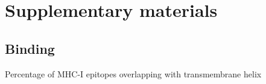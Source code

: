 \documentclass{article}
\begin{document}
\appendix
\section{Supplementary materials}

\subsection{Binding}

\begin{table}
  
  \caption{Percentage of MHC-I epitopes overlapping with transmembrane helix}
  \label{table:1}
\end{table}
\end{document}

